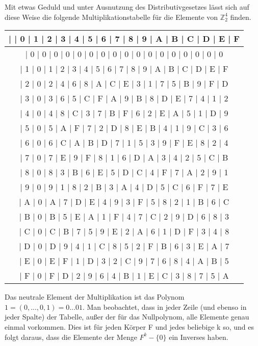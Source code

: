 \documentclass[a4paper]{article}
\begin{document}
\begin{multicols}{3}
    Mit etwas Geduld und unter Ausnutzung des Distributivgesetzes lässt sich auf diese Weise die folgende Multiplikationstabelle für die Elemente von $\mathbb{Z}^4_2$ finden.
    \begin{tabular}{c}
    |   | 0  | 1  | 2  | 3  | 4  | 5  | 6  | 7  | 8  | 9  | A  | B  | C  | D  | E  | F  \\\hline
    | 0  | 0  | 0  | 0  | 0  | 0  | 0  | 0  | 0  | 0  | 0  | 0  | 0  | 0  | 0  | 0  | 0  \\
    | 1  | 0  | 1  | 2  | 3  | 4  | 5  | 6  | 7  | 8  | 9  | A  | B  | C  | D  | E  | F  \\
    | 2  | 0  | 2  | 4  | 6  | 8  | A  | C  | E  | 3  | 1  | 7  | 5  | B  | 9  | F  | D  \\
    | 3  | 0  | 3  | 6  | 5  | C  | F  | A  | 9  | B  | 8  | D  | E  | 7  | 4  | 1  | 2  \\
    | 4  | 0  | 4  | 8  | C  | 3  | 7  | B  | F  | 6  | 2  | E  | A  | 5  | 1  | D  | 9  \\
    | 5  | 0  | 5  | A  | F  | 7  | 2  | D  | 8  | E  | B  | 4  | 1  | 9  | C  | 3  | 6  \\
    | 6  | 0  | 6  | C  | A  | B  | D  | 7  | 1  | 5  | 3  | 9  | F  | E  | 8  | 2  | 4  \\
    | 7  | 0  | 7  | E  | 9  | F  | 8  | 1  | 6  | D  | A  | 3  | 4  | 2  | 5  | C  | B  \\
    | 8  | 0  | 8  | 3  | B  | 6  | E  | 5  | D  | C  | 4  | F  | 7  | A  | 2  | 9  | 1  \\
    | 9  | 0  | 9  | 1  | 8  | 2  | B  | 3  | A  | 4  | D  | 5  | C  | 6  | F  | 7  | E  \\
    | A  | 0  | A  | 7  | D  | E  | 4  | 9  | 3  | F  | 5  | 8  | 2  | 1  | B  | 6  | C  \\
    | B  | 0  | B  | 5  | E  | A  | 1  | F  | 4  | 7  | C  | 2  | 9  | D  | 6  | 8  | 3  \\
    | C  | 0  | C  | B  | 7  | 5  | 9  | E  | 2  | A  | 6  | 1  | D  | F  | 3  | 4  | 8  \\
    | D  | 0  | D  | 9  | 4  | 1  | C  | 8  | 5  | 2  | F  | B  | 6  | 3  | E  | A  | 7  \\
    | E  | 0  | E  | F  | 1  | D  | 3  | 2  | C  | 9  | 7  | 6  | 8  | 4  | A  | B  | 5  \\
    | F  | 0  | F  | D  | 2  | 9  | 6  | 4  | B  | 1  | E  | C  | 3  | 8  | 7  | 5  | A  
    \end{tabular}

    Das neutrale Element der Multiplikation ist das Polynom $1=(0,..., 0 ,1) = 0... 01$. Man beobachtet, dass in jeder Zeile (und ebenso in jeder Spalte) der Tabelle, außer der für das Nullpolynom, alle Elemente genau einmal vorkommen. Dies ist für jeden Körper F und jedes beliebige k so, und es folgt daraus, dass die Elemente der Menge $F^k-\{0\}$ ein Inverses haben.


\end{multicols}
\end{document}
